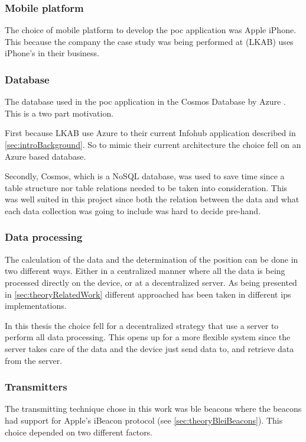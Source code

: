 \subsubsection{Mobile platform}\label{sec:methodSoftwareDesignMobilePlatform}
The choice of mobile platform to develop the \acrlong{poc} application was Apple iPhone.
This because the company the case study was being performed at (LKAB) uses iPhone's in their business.


\subsubsection{Database}\label{sec:methodSoftwareDesignDatabase}
The database used in the \acrshort{poc} application in the Cosmos Database by Azure \cite{IntroductionAzureCosmos}.
This is a two part motivation.

\bigskip

First because LKAB use Azure to their current Infohub application described in \cref{sec:introBackground}.
So to mimic their current architecture the choice fell on an Azure based database.

\bigskip

Secondly, Cosmos, which is a NoSQL database, was used to save time since a table structure nor table relations needed to be taken into consideration.
This was well suited in this project since both the relation between the data and what each data collection was going to include was hard to decide pre-hand.


\subsubsection{Data processing}\label{sec:methodSoftwareDesignData}
The calculation of the data and the determination of the position can be done in two different ways.
Either in a centralized manner where all the data is being processed directly on the device, or at a decentralized server.
As being presented in \cref{sec:theoryRelatedWork} different approached has been taken in different \acrshort{ips} implementations.

\bigskip

In this thesis the choice fell for a decentralized strategy that use a server to perform all data processing.
This opens up for a more flexible system since the server takes care of the data and the device just send data to, and retrieve data from the server.


\subsubsection{Transmitters}\label{sec:methodSoftwareDesignTransmitters}
The transmitting technique chose in this work was \acrshort{ble} beacons where the beacons had support for Apple's iBeacon protocol (see \cref{sec:theoryBleiBeacons}).
This choice depended on two different factors.

